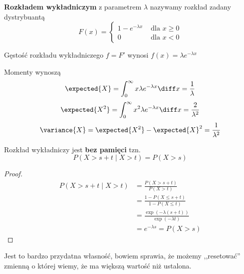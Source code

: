 \begin{definition}
    \textbf{Rozkładem wykładniczym} z parametrem \( \lambda \) nazywamy rozkład zadany dystrybuantą
    \[
        F(x) = \begin{cases}
            1 - e^{-\lambda x} & \text{ dla } x \geq 0 \\
            0 & \text{ dla } x < 0
        \end{cases}
    \]
\end{definition}

Gęstość rozkładu wykładniczego \( f = F' \) wynosi \( f(x) = \lambda e^{-\lambda x} \)

Momenty wynoszą
\[
    \expected{X} = \int_0^\infty x\lambda e^{-\lambda x} \diff x = \frac{1}{\lambda}
\]
\[
    \expected{X^2} = \int_0^\infty x^2\lambda e^{-\lambda x} \diff x = \frac{2}{\lambda^2}
\]
\[
   \variance{X} = \expected{X^2} - \expected{X}^2 = \frac{1}{\lambda^2}
\]

\begin{theorem}[Lemat 8.4 P\&C]
    Rozkład wykładniczy jest \textbf{bez pamięci} tzn.
    \[ 
        P(X > s + t \mid X > t) = P(X > s)
    \]
\end{theorem}
\begin{proof}
    \begin{align*}
            P(X > s + t \mid X > t) &= \frac{P(X > s + t)}{P(X > t)} \\
            &= \frac{1 - P(X \leq s + t)}{1 - P(X \leq t)} \\
            &= \frac{\exp(-\lambda(s + t))}{\exp(-\lambda t)} \\
            &= e^{-\lambda s} = P(X > s)
    \end{align*}
\end{proof}

Jest to bardzo przydatna własność, bowiem sprawia, że możemy ,,resetować'' zmienną o której wiemy, że ma większą wartość niż ustalona.

